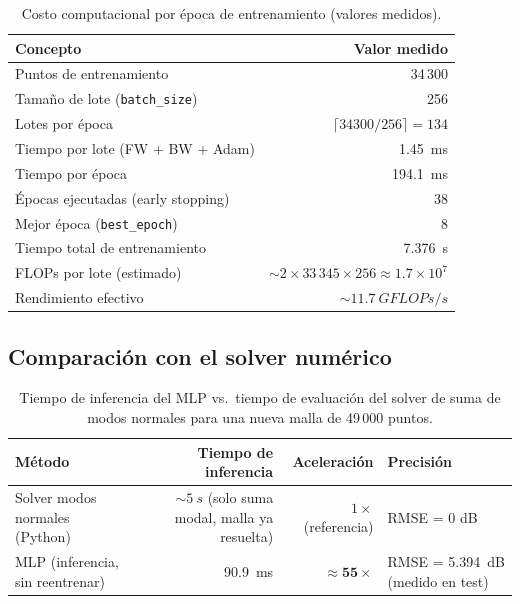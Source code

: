 \documentclass[12pt,a4paper]{article}
\begin{document}
\begin{table}[H]
\centering
\caption{Costo computacional por época de entrenamiento (valores medidos).}
\label{tab:tiempos_epoca}
\begin{tabular}{lr}
\toprule
Concepto & Valor medido \\
\midrule
Puntos de entrenamiento              & 34\,300 \\
Tamaño de lote (\texttt{batch\_size}) & 256 \\
Lotes por época                      & $\lceil 34300/256 \rceil = 134$ \\
Tiempo por lote (FW + BW + Adam)     & \SI{1.45}{ms} \\
Tiempo por época                     & \SI{194.1}{ms} \\
Épocas ejecutadas (early stopping)   & 38 \\
Mejor época (\texttt{best\_epoch})    & 8 \\
Tiempo total de entrenamiento        & \SI{7.376}{s} \\
\midrule
FLOPs por lote (estimado)            & $\sim 2 \times 33\,345 \times 256 \approx 1.7\times10^7$ \\
Rendimiento efectivo                 & $\sim\SI{11.7}{GFLOPs/s}$ \\
\bottomrule
\end{tabular}
\end{table}

\subsection{Comparación con el solver numérico}

\begin{table}[H]
\centering
\caption{Tiempo de inferencia del MLP vs.\ tiempo de evaluación del solver
         de suma de modos normales para una nueva malla de 49\,000 puntos.}
\label{tab:comparacion_tiempos}
\begin{tabular}{lrrl}
\toprule
Método & Tiempo de inferencia & Aceleración & Precisión \\
\midrule
Solver modos normales (Python)
  & $\sim\SI{5}{s}$ (solo suma modal, malla ya resuelta)
  & $1\times$ (referencia)
  & RMSE = 0 dB \\
MLP (inferencia, sin reentrenar)
  & \SI{90.9}{ms}
  & $\mathbf{\approx 55\times}$
  & RMSE = \SI{5.394}{dB} (medido en test) \\
\bottomrule
\end{tabular}
\end{table}
\end{document}
